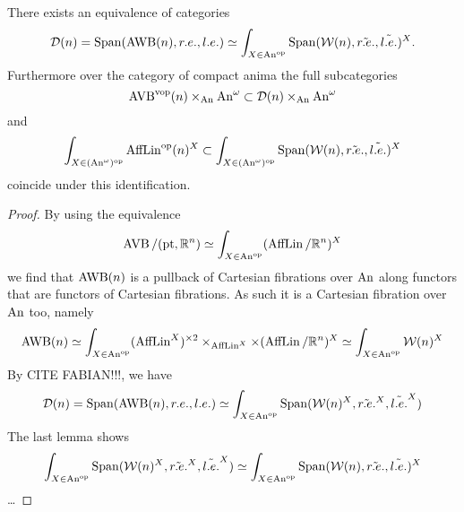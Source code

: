 \begin{proposition}\label{prop: asunst}

There exists an equivalence of categories 
\[
    \mathcal{D}(n) = \operatorname{Span}(\operatorname{AWB}(n), r.e., l.e.) \simeq \int_{X \in \operatorname{An}^{\mathrm{op}}}\operatorname{Span}(\mathcal W(n), \tilde{r.e.}, \tilde{l.e.})^X.
\]
Furthermore over the category of compact anima
the full subcategories 
\[
    \operatorname{AVB}^{\mathrm{vop}}(n) \times_{\operatorname{An}}\operatorname{An}^\omega \subset \mathcal{D}(n) \times_{\operatorname{An}}\operatorname{An}^\omega
\]
and 
\[
    \int_{X \in (\operatorname{An}^\omega)^{\mathrm{op}}} \operatorname{AffLin}^{\mathrm{op}}(n)^X \subset \int_{X \in (\operatorname{An}^\omega)^{\mathrm{op}}}\operatorname{Span}(\mathcal W(n), \tilde{r.e.}, \tilde{l.e.})^X
\]
coincide under this identification.


\end{proposition}
\begin{proof}
    By using the equivalence 
    \[
    \operatorname{AVB}/(\mathrm{pt}, \mathbb{R}^n) \simeq \int_{X \in \operatorname{An}^{\mathrm{op}}} (\operatorname{AffLin}/\mathbb{R}^n)^X   
    \]
    we find that $\operatorname{AWB}(n)$ is a pullback of Cartesian fibrations over $\operatorname{An}$ along functors that 
    are functors of Cartesian fibrations.
    As such it is a Cartesian fibration over $\operatorname{An}$ too, namely
    \[
    \operatorname{AWB}(n) \simeq \int_{X \in \operatorname{An}^{\mathrm{op}}} (\operatorname{AffLin}^X)^{\times 2} \times_{\operatorname{AffLin}^X} \times (\operatorname{AffLin}/\mathbb{R}^n)^X \simeq \int_{X \in \operatorname{An}^{\mathrm{op}}} \mathcal W(n)^X
    \]
    By CITE FABIAN!!!, we have 
    \[
    \mathcal{D}(n) = \operatorname{Span}(\operatorname{AWB}(n), r.e., l.e.) \simeq \int_{X \in \operatorname{An}^{\mathrm{op}}} \operatorname{Span}(\mathcal W(n)^X, \tilde{r.e.}^X, \tilde{l.e.}^X)    
    \]
    The last lemma shows 
    \[
        \int_{X \in \operatorname{An}^{\mathrm{op}}} \operatorname{Span}(\mathcal W(n)^X, \tilde{r.e.}^X, \tilde{l.e.}^X) \simeq \int_{X \in \operatorname{An}^{\mathrm{op}}} \operatorname{Span}(\mathcal W(n), \tilde{r.e.}, \tilde{l.e.})^X  
    \]
    \dots


\end{proof}    
    

